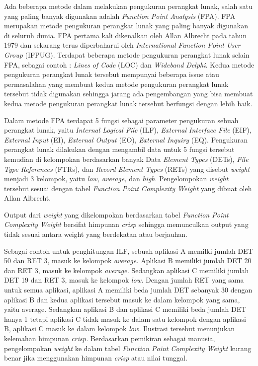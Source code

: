 \documentclass[a4paper]{article}
\begin{document}
\begin{multicols}{2}
\par Ada beberapa metode dalam melakukan pengukuran perangkat lunak, salah satu yang paling banyak digunakan adalah \textit{Function Point Analysis} (FPA). FPA merupakan metode pengukuran perangkat lunak yang paling banyak digunakan di seluruh dunia. FPA pertama kali dikenalkan oleh Allan Albrecht pada tahun 1979 dan sekarang terus diperbaharui oleh \textit{International Function Point User Group} (IFPUG). Terdapat beberapa metode pengukuran perangkat lunak selain FPA, sebagai contoh : \textit{Lines of Code} (LOC) dan \textit{Wideband Delphi}. Kedua metode pengukuran perangkat lunak tersebut mempunyai beberapa issue atau permasalahan yang membuat kedua metode pengukuran perangkat lunak tersebut tidak digunakan sehingga jarang ada pengembangan yang bisa membuat kedua metode pengukuran perangkat lunak tersebut berfungsi dengan lebih baik. \par Dalam metode FPA terdapat 5 fungsi sebagai parameter pengukuran sebuah perangkat lunak, yaitu \textit{Internal Logical File} (ILF), \textit{External Interface File} (EIF), \textit{External Input} (EI), \textit{External Output} (EO), \textit{External Inquiry} (EQ). Pengukuran perangkat lunak dilakukan dengan mengambil data untuk 5 fungsi tersebut kemudian di kelompokan berdasarkan banyak Data \textit{Element Types} (DETs), \textit{File Type References} (FTRs), dan \textit{Record Element Types} (RETs) yang disebut \textit{weight} menjadi 3 kelompok, yaitu \textit{low, average,} dan \textit{high}\citep{Balaji2013}. Pengelompokan \textit{weight} tersebut sesuai dengan tabel \textit{Function Point Complexity Weight} yang dibuat oleh Allan Albrecht\citep{Xia2008}.

\par Output dari \textit{weight} yang dikelompokan berdasarkan tabel \textit{Function Point Complexity Weight} bersifat himpunan \textit{crisp} sehingga memunculkan output yang tidak sesuai antara weight yang berdekatan atau berjauhan.

\par Sebagai contoh untuk penghitungan ILF, sebuah aplikasi A memilki jumlah DET 50 dan RET 3, masuk ke kelompok \textit{average.} Aplikasi B memiliki jumlah DET 20 dan RET 3, masuk ke kelompok \textit{average.} Sedangkan aplikasi C memiliki jumlah DET 19 dan RET 3, masuk ke kelompok \textit{low.} Dengan jumlah RET yang sama untuk semua aplikasi, aplikasi A memiliki beda jumlah DET sebanyak 30 dengan aplikasi B dan kedua aplikasi tersebut masuk ke dalam kelompok yang sama, yaitu average. Sedangkan aplikasi B dan aplikasi C memiliki beda jumlah DET hanya 1 tetapi aplikasi C tidak masuk ke dalam satu kelompok dengan aplikasi B, aplikasi C masuk ke dalam kelompok \textit{low.} Ilustrasi tersebut menunjukan kelemahan himpunan \textit{crisp.} Berdasarkan pemikiran sebagai manusia, pengelompokan \textit{weight} ke dalam tabel \textit{Function Point Complexity Weight} kurang benar jika menggunakan himpunan \textit{crisp} atau nilai tunggal.


\end{multicols}
\end{document}

